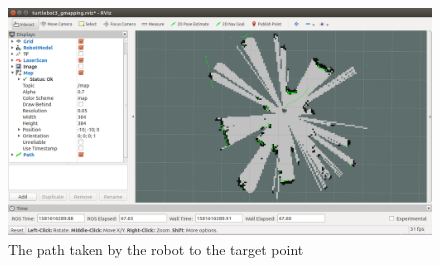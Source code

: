 \documentclass[12pt,a4paper]{article}
\begin{document}
\begin{enumerate}[label=(\alph*)]
	\begin{figure}[!htb]
		\centering
		\includegraphics[width=\textwidth]{fig/4e-path.png}
		\caption{The path taken by the robot to the target point}
		\label{fig:during}
	\end{figure}


\end{enumerate}
\end{document}
